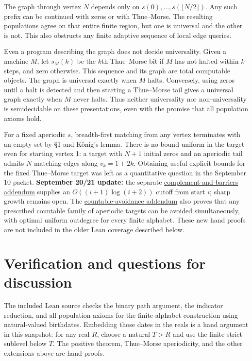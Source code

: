 \documentclass[
  11pt,
]{article}
\begin{document}
The graph through vertex \(N\) depends only on
\(s(0),\ldots,s(\lfloor N/2\rfloor)\). Any such prefix can be continued
with zeros or with Thue--Morse. The resulting populations agree on that
entire finite region, but one is universal and the other is not. This
also obstructs any finite adaptive sequence of local edge queries.

Even a program describing the graph does not decide universality. Given
a machine \(M\), let \(s_M(k)\) be the \(k\)th Thue--Morse bit if \(M\)
has not halted within \(k\) steps, and zero otherwise. This sequence and
its graph are total computable objects. The graph is universal exactly
when \(M\) halts. Conversely, using zeros until a halt is detected and
then starting a Thue--Morse tail gives a universal graph exactly when
\(M\) never halts. Thus neither universality nor non-universality is
semidecidable on these presentations, even with the promise that all
population axioms hold.

For a fixed aperiodic \(s\), breadth-first matching from any vertex
terminates with an empty set by §1 and König's lemma. There is no bound
uniform in the target even for starting vertex 1: a target with \(N+1\)
initial zeros and an aperiodic tail admits \(N\) matching edges along
\(v_k=1+2k\). Obtaining useful explicit bounds for the fixed Thue--Morse
target was left as a quantitative question in the September 10 packet.
\textbf{September 20/21 update:} the separate
\href{complement-and-barriers.md}{complement-and-barriers addendum}
supplies an \(O((i+1)\log(i+2))\) cutoff from start \(i\); sharp growth
remains open. The \href{countable-avoidance.md}{countable-avoidance
addendum} also proves that any prescribed countable family of aperiodic
targets can be avoided simultaneously, with optimal uniform outdegree
for every finite alphabet. These new hand proofs are not included in the
older Lean coverage described below.

\section{Verification and questions for
discussion}\label{verification-and-questions-for-discussion}

The included Lean source checks the binary path argument, the indicator
reduction, and all population axioms for the finite-alphabet
construction using natural-valued birthdates. Embedding those dates in
the reals is a hand argument in this snapshot: for any real \(R\),
choose a natural \(T>R\) and use the finite strict sublevel below \(T\).
The positive theorem, Thue--Morse aperiodicity, and the other extensions
above are hand proofs.
\end{document}

